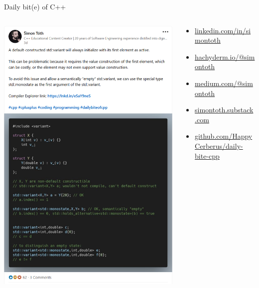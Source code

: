 \documentclass[aspectratio=169]{beamer}
\begin{document}
\begin{frame}{Daily bit(e) of C++}
\begin{columns}
    \begin{column}{0.35\textwidth}
        \includegraphics[height=0.8\textheight]{static/daily_bite.png}
    \end{column}
    \begin{column}{0.6\textwidth}
        \begin{itemize}
            \item \href{https://www.linkedin.com/in/simontoth/}{linkedin.com/in/simontoth}
            \item \href{https://hachyderm.io/@simontoth}{hachyderm.io/@simontoth}
            \item \href{https://medium.com/@simontoth}{medium.com/@simontoth}
            \item \href{https://simontoth.substack.com}{simontoth.substack.com}
            \item \href{https://github.com/HappyCerberus/daily-bite-cpp}{github.com/HappyCerberus/daily-bite-cpp}
        \end{itemize}
    \end{column}
\end{columns}
\end{frame}
\end{document}
